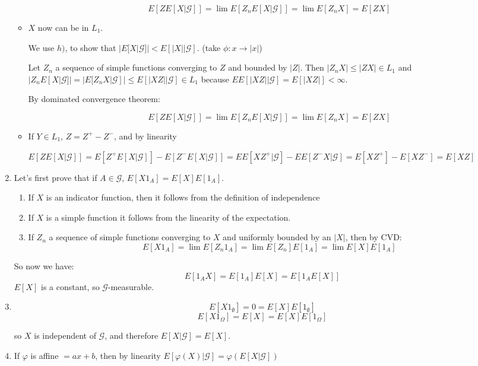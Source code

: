 \documentclass[12pt]{article}
\begin{document}
\begin{enumerate}
\begin{itemize}
$$ E[ZE[X|\mathcal G]] = \lim E[Z_nE[X|\mathcal G]] = \lim E[Z_nX] = E[ZX] $$


\item $X$ now can be in $L_1$. 

We use $h)$, to show that $|E[X|\mathcal G]| < E[|X||\mathcal G]$. (take $\phi : x \rightarrow |x|$)

Let $Z_n$ a sequence of simple functions converging to $Z$ and bounded by $|Z|$. Then 
$|Z_n X| \le |ZX| \in L_1$ and $|Z_nE[X|\mathcal G]| = |E[Z_nX|\mathcal G]| \le E[|XZ| | \mathcal G] \in L_1$ because $EE[|XZ| | \mathcal G] = E[|XZ|] < \infty$.

By dominated convergence theorem:

$$ E[ZE[X|\mathcal G]] = \lim E[Z_nE[X|\mathcal G]] = \lim E[Z_nX] = E[ZX] $$

\item If $Y \in L_1$, $Z = Z^+ - Z^-$, and by linearity

$E[Z E[X|\mathcal G]] = E[Z^+ E[X|\mathcal G]] - E[Z^- E[X|\mathcal G]] = EE[XZ^+|\mathcal G] - EE[Z^-X|\mathcal G] = E[XZ^+] - E[XZ^-] = E[XZ]$


\end{itemize}

\item 


Let's first prove that if $A \in \mathcal G$, $E[X1_A] = E[X] E[1_A]$.
\begin{enumerate}
\item If $X$ is an indicator function, then it follows from the definition of independence
\item If $X$ is a simple function it follows from the linearity of the expectation.
\item If $Z_n$ a sequence of simple functions converging to $X$ and uniformly bounded by an $|X|$, then by CVD:
$$E[X1_A] = \lim E[Z_n1_A] = \lim E[Z_n] E[1_A] = \lim E[X] E[1_A]$$
\end{enumerate}
So now we have:
$$E[1_A X] = E[1_A]E[X] = E[1_AE[X]]$$
$E[X]$ is a constant, so $\mathcal G$-measurable.

\item 
$$E[X 1_{\emptyset}] = 0 = E[X] E[1_{\emptyset}]$$
$$E[X 1_{\Omega}] = E[X] = E[X] E[1_{\Omega}]$$

so $X$ is independent of $\mathcal G$, and therefore $E[X|\mathcal G] = E[X]$.

\item 

If $\varphi$ is affine $ = ax + b$, then by linearity
$E[\varphi(X) | \mathcal G] = \varphi(E[X|\mathcal G])$


\end{enumerate}
\end{document}
